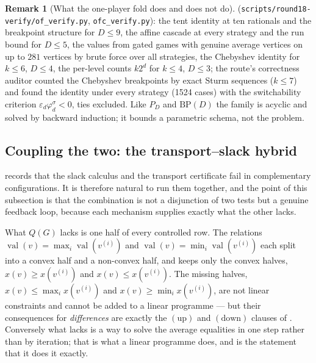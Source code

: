 \documentclass[11pt]{article}
\theoremstyle{plain}
\theoremstyle{definition}
\newtheorem{remark}[theorem]{Remark}
\DeclareMathOperator{\val}{val}
\begin{document}
\begin{remark}[What the one-player fold does and does not do]
(\texttt{scripts/round18-verify/of\_verify.py}, \texttt{ofc\_verify.py}):
the tent identity at ten rationals and the breakpoint structure for
$D\le9$, the affine cascade at every strategy and the run bound for
$D\le5$, the values from gated games with genuine average vertices on up to
$281$ vertices by brute force over all strategies, the Chebyshev identity
for $k\le6$, $D\le4$, the per-level counts $k2^{d}$ for $k\le4$, $D\le3$;
the route's correctness auditor counted the Chebyshev breakpoints by exact
Sturm sequences ($k\le7$) and found the identity under every strategy
(1524 cases) with the switchability criterion
$\varepsilon_d\varphi^{\sigma}_d<0$, ties excluded.
Like $P_D$ and $\mathrm{BP}(D)$ the family is acyclic and solved by
backward induction; it bounds a parametric schema, not the problem.
\end{remark}


\subsection{Coupling the two: the transport--slack hybrid}\label{sec:hybrid}

 records that the slack calculus and the transport
certificate fail in complementary configurations. It is therefore natural
to run them together, and the point of this subsection is that the
combination is not a disjunction of two tests but a genuine feedback loop,
because each mechanism supplies exactly what the other lacks.

What $Q(G)$ lacks is one half of every controlled row. The relations
$\val(v)=\max_i\val(v^{(i)})$ and $\val(v)=\min_i\val(v^{(i)})$ each split
into a convex half and a non-convex half, and  keeps
only the convex halves, $x(v)\ge x(v^{(i)})$ and $x(v)\le x(v^{(i)})$. The
missing halves, $x(v)\le\max_i x(v^{(i)})$ and $x(v)\ge\min_i x(v^{(i)})$,
are not linear constraints and cannot be added to a linear programme --- but
their consequences for \emph{differences} are exactly the $(\mathrm{up})$
and $(\mathrm{down})$ clauses of . Conversely what
 lacks is a way to solve the average equalities in one
step rather than by iteration; that is what a linear programme does, and
 is the statement that it does it exactly.
\end{document}
